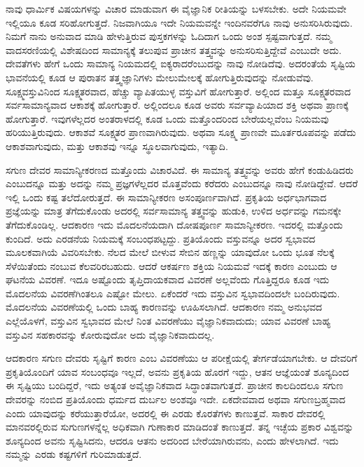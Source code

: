 ನಾವು ಧಾರ್ಮಿಕ ವಿಷಯಗಳನ್ನು ವಿಚಾರ ಮಾಡುವಾಗ ಈ ವೈಜ್ಞಾನಿಕ ರೀತಿಯನ್ನು ಬಳಸಬೇಕು. ಅದೇ ನಿಯಮವೇ ಇಲ್ಲಿಯೂ ಕೂಡ ಸರಿಹೋಗುತ್ತದೆ. ನಿಜವಾಗಿಯೂ ಇದೇ ನಿಯಮವನ್ನೇ ಇಂದಿನವರೆಗೂ ನಾವು ಅನುಸರಿಸಿರುವುದು. ನಿಮಗೆ ನಾನು ಅನುವಾದ ಮಾಡಿ ಹೇಳುತ್ತಿರುವ ಪುಸ್ತಕಗಳನ್ನು ಓದಿದಾಗ ಒಂದು ಅಂಶ ಸ್ಪಷ್ಟವಾಗುತ್ತದೆ. ನಮ್ಮ ವಾದಸರಣಿಯಲ್ಲಿ ವಿಶೇಷದಿಂದ ಸಾಮಾನ್ಯಕ್ಕೆ ತಲುಪುವ ಪ್ರಾಚೀನ ತತ್ತ್ವವನ್ನು ಅನುಸರಿಸುತ್ತಿದ್ದೇವೆ ಎಂಬುದೇ ಅದು. ದೇವತೆಗಳು ಹೇಗೆ ಒಂದು ಸಾಮಾನ್ಯ ನಿಯಮದಲ್ಲಿ ಐಕ್ಯರಾದರೆಂಬುದನ್ನು ನಾವು ನೋಡಿದೆವು. ಅದರಂತೆಯೆ ಸೃಷ್ಟಿಯ ಭಾವನೆಯಲ್ಲಿ ಕೂಡ ಆ ಪುರಾತನ ತತ್ತ್ವಜ್ಞಾನಿಗಳು ಮೇಲುಮೇಲಕ್ಕೆ ಹೋಗುತ್ತಿರುವುದನ್ನು ನೋಡುವೆವು. ಸೂಕ್ಷ್ಮವಸ್ತುವಿನಿಂದ ಸೂಕ್ಷ್ಮತರವಾದ, ಹೆಚ್ಚು ವ್ಯಾಪಿತಯುಳ್ಳ ವಸ್ತುವಿಗೆ ಹೋಗುತ್ತಾರೆ. ಅಲ್ಲಿಂದ ಮತ್ತೂ ಸೂಕ್ಷ್ಮತರವಾದ ಸರ್ವಸಾಮಾನ್ಯವಾದ ಆಕಾಶಕ್ಕೆ ಹೋಗುತ್ತಾರೆ. ಅಲ್ಲಿಂದಲೂ ಕೂಡ ಅವರು ಸರ್ವವ್ಯಾಪಿಯಾದ ಶಕ್ತಿ ಅಥವಾ ಪ್ರಾಣಕ್ಕೆ ಹೋಗುತ್ತಾರೆ. ಇವುಗಳೆಲ್ಲದರ ಅಂತರಾಳದಲ್ಲಿ ಕೂಡ ಒಂದು ಮತ್ತೊಂದರಿಂದ ಬೇರೆಯಲ್ಲವೆಂಬ ನಿಯಮವು ಹರಿಯುತ್ತಿರುವುದು. ಆಕಾಶವೆ ಸೂಕ್ಷ್ಮತರ ಪ್ರಾಣವಾಗಿರುವುದು. ಅಥವಾ ಸೂಕ್ಷ್ಮ ಪ್ರಾಣವೇ ಮೂರ್ತರೂಪವನ್ನು ಪಡೆದು ಆಕಾಶವಾಗುವುದು, ಮತ್ತು ಆಕಾಶವು ಇನ್ನೂ ಸ್ಥೂಲವಾಗುವುದು, ಇತ್ಯಾದಿ. 

\vskip 5pt

ಸಗುಣ ದೇವರ ಸಾಮಾನ್ಯೀಕರಣದ ಮತ್ತೊಂದು ವಿಚಾರವಿದೆ. ಈ ಸಾಮಾನ್ಯ ತತ್ತ್ವವನ್ನು ಅವರು ಹೇಗೆ ಕಂಡುಹಿಡಿದರು ಎಂಬುದನ್ನೂ ಮತ್ತು ಅದನ್ನು ನಮ್ಮ ಪ್ರಜ್ಞಗಳೆಲ್ಲದರ ಮೊತ್ತವೆಂದು ಕರೆದರು ಎಂಬುದನ್ನೂ ನಾವು ನೋಡಿದ್ದೇವೆ. ಆದರೆ ಇಲ್ಲಿ ಒಂದು ಕಷ್ಟ ತಲೆದೋರುತ್ತದೆ. ಈ ಸಾಮಾನ್ಯೀಕರಣ ಅಸಂಪೂರ್ಣವಾಗಿದೆ. ಪ್ರಕೃತಿಯ ಅರ್ಧಭಾಗವಾದ ಪ್ರಜ್ಞೆಯನ್ನು ಮಾತ್ರ ತೆಗೆದುಕೊಂಡು ಅದರಲ್ಲಿ ಸರ್ವಸಾಮಾನ್ಯ ತತ್ತ್ವವನ್ನು ಹುಡುಕಿ, ಉಳಿದ ಅರ್ಧವನ್ನು ಗಮನಕ್ಕೇ ತೆಗೆದುಕೊಂಡಿಲ್ಲ. ಆದಕಾರಣ ಇದು ಮೊದಲನೆಯದಾಗಿ ದೋಷಪೂರ್ಣ ಸಾಮಾನ್ಯೀಕರಣ. ಇದರಲ್ಲಿ ಮತ್ತೊಂದು ಕುಂದಿದೆ. ಅದು ಎರಡನೆಯ ನಿಯಮಕ್ಕೆ ಸಂಬಂಧಪಟ್ಟದ್ದು. ಪ್ರತಿಯೊಂದು ವಸ್ತುವನ್ನೂ ಅದರ ಸ್ವಭಾವದ ಮೂಲಕವಾಗಿಯೆ ವಿವರಿಸಬೇಕು. ನೆಲದ ಮೇಲೆ ಬೀಳುವ ಸೇಬಿನ ಹಣ್ಣನ್ನು ಯಾವುದೋ ಒಂದು ಭೂತ ನೆಲಕ್ಕೆ ಸೆಳೆಯಿತೆಂದು ನಂಬುವ ಕೆಲವರಿರಬಹುದು. ಆದರೆ ಆಕರ್ಷಣ ಶಕ್ತಿಯ ನಿಯಮವೆ ಇದಕ್ಕೆ ಕಾರಣ ಎಂಬುದು ಆ ಘಟನೆಯ ವಿವರಣೆ. ಇದೂ ಅಷ್ಟೊಂದು ತೃಪ್ತಿದಾಯಕವಾದ ವಿವರಣೆ ಅಲ್ಲವೆಂದು ಗೊತ್ತಿದ್ದರೂ ಕೂಡ ಇದು ಮೊದಲನೆಯ ವಿವರಣೆಗಿಂತಲೂ ಎಷ್ಟೋ ಮೇಲು. ಏಕೆಂದರೆ ಇದು ವಸ್ತುವಿನ ಸ್ವಭಾವದಿಂದಲೇ ಬಂದಿರುವುದು. ಮೊದಲನೆಯ ವಿವರಣೆಯಲ್ಲಿ ಒಂದು ಬಾಹ್ಯ ಕಾರಣವನ್ನು ಊಹಿಸಲಾಗಿದೆ. ಆದಕಾರಣ ನಮ್ಮ ಅನುಭವದ ಎಲ್ಲೆಯೊಳಗೆ, ವಸ್ತುವಿನ ಸ್ವಭಾವದ ಮೇಲೆ ನಿಂತ ವಿವರಣೆಯು ವೈಜ್ಞಾನಿಕವಾದುದು; ಯಾವ ವಿವರಣೆ ಬಾಹ್ಯ ವಸ್ತುವಿನ ಸಹಕಾರವನ್ನು ಕೋರುವುದೋ ಅದು ವೈಜ್ಞಾನಿಕವಾದುದಲ್ಲ. 

\vskip 5pt

ಆದಕಾರಣ ಸಗುಣ ದೇವರು ಸೃಷ್ಟಿಗೆ ಕಾರಣ ಎಂಬ ವಿವರಣೆಯು ಆ ಪರೀಕ್ಷೆಯಲ್ಲಿ ತೇರ್ಗಡೆಯಾಗಬೇಕು. ಆ ದೇವರಿಗೆ ಪ್ರಕೃತಿಯೊಂದಿಗೆ ಯಾವ ಸಂಬಂಧವೂ ಇಲ್ಲದೆ, ಅವನು ಪ್ರಕೃತಿಯ ಹೊರಗೆ ಇದ್ದು, ಆತನ ಆಜ್ಞೆಯಂತೆ ಶೂನ್ಯದಿಂದ ಈ ಸೃಷ್ಟಿಯು ಬಂದಿದ್ದರೆ, ಇದು ಅತ್ಯಂತ ಅವೈಜ್ಞಾನಿಕವಾದ ಸಿದ್ಧಾಂತವಾಗುತ್ತದೆ. ಪ್ರಾಚೀನ ಕಾಲದಿಂದಲೂ ಸಗುಣ ದೇವರನ್ನು ನಂಬಿದ ಪ್ರತಿಯೊಂದು ಧರ್ಮದ ದುರ್ಬಲ ಅಂಶವೂ ಇದೇ. ಏಕದೇವವಾದ ಅಥವಾ ಸಗುಣಬ್ರಹ್ಮವಾದ ಎಂದು ಯಾವುದನ್ನು ಕರೆಯುತ್ತಾರೆಯೋ, ಅದರಲ್ಲಿ ಈ ಎರಡು ಕೊರತೆಗಳು ಕಾಣುತ್ತವೆ. ಸಾಕಾರ ದೇವರಲ್ಲಿ ಮಾನವರಲ್ಲಿರುವ ಸುಗುಣಗಳನ್ನೆಲ್ಲ ಅಧಿಕವಾಗಿ ಗುಣಾಕಾರ ಮಾಡಿದಂತೆ ಕಾಣುತ್ತದೆ. ತನ್ನ ಇಚ್ಛೆಯ ಪ್ರಕಾರ ವಿಶ್ವವನ್ನು ಶೂನ್ಯದಿಂದ ಅವನು ಸೃಷ್ಟಿಸಿದನು, ಆದರೂ ಆತನು ಅದರಿಂದ ಬೇರೆಯಾಗಿರುವನು, ಎಂದು ಹೇಳಲಾಗಿದೆ. ಇದು ನಮ್ಮನ್ನು ಎರಡು ಕಷ್ಟಗಳಿಗೆ ಗುರಿಮಾಡುತ್ತದೆ. 

